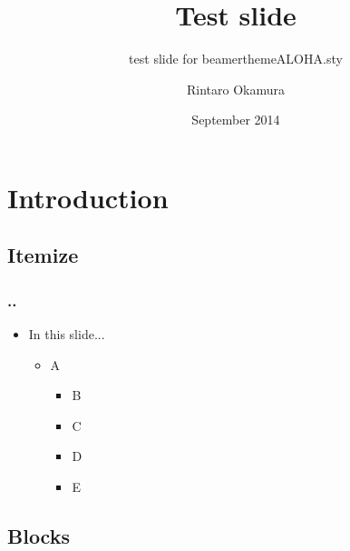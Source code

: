\documentclass[ignorenonframetext,14pt]{beamer}
\title[]{\HelvNeueB Test slide}
\subtitle{\HelvNeueB test slide for beamerthemeALOHA.sty}
\author[]{\HelvNeueT Rintaro Okamura}
\institute[]{\HelvNeueT\footnotesize Tohoku University}
\date[September 2014]{\HelvNeueT September 2014}
\def\wingdsqr{{\fontspec{Wingdings Regular} p}}
\def\wingdsqflr{{\fontspec{Wingdings Regular} v}}
\def\wingdrarrow{{\fontspec{Wingdings 3} g}}
\begin{document}
\begin{frame}
    \maketitle
    \thispagestyle{empty}
\end{frame}

\section{Introduction}

\subsection{Itemize}

\begin{frame}
    \frametitle{\insertsectionnumber.\insertsubsectionnumber. \insertsubsectionhead}

    \begin{itemize}
        \item[\Large \wingdrarrow] \large In this slide...
            \begin{itemize}
                \normalsize
                \item[\wingdsqr] A
                \begin{itemize}
                    \normalsize
                    \item[\wingdsqflr] \textcolor{ALHPink}{B}
                    \item[\wingdsqflr] \textcolor{ALHBlue}{C}
                    \item[\wingdsqflr] D
                    \item[\wingdsqflr] E
                \end{itemize}
            \end{itemize}
    \end{itemize}
\end{frame}

\subsection{Blocks}
\end{document}
